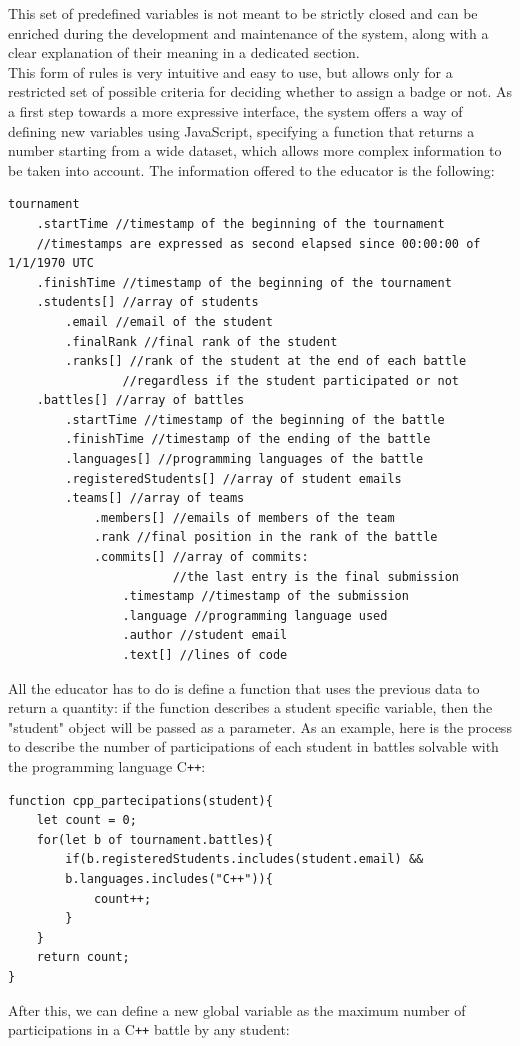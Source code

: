 This set of predefined variables is not meant to be strictly closed and can be enriched during the development and maintenance of the system, along with a clear explanation of their meaning in a dedicated section.
\\
This form of rules is very intuitive and easy to use, but allows only for a restricted set of possible criteria for deciding whether to assign a badge or not. As a first step towards a more expressive interface, the system offers a way of defining new variables using JavaScript, specifying a function that returns a number starting from a wide dataset, which allows more complex information to be taken into account. The information offered to the educator is the following:
\begin{verbatim}
tournament
    .startTime //timestamp of the beginning of the tournament
    //timestamps are expressed as second elapsed since 00:00:00 of 1/1/1970 UTC
    .finishTime //timestamp of the beginning of the tournament
    .students[] //array of students
        .email //email of the student
        .finalRank //final rank of the student
        .ranks[] //rank of the student at the end of each battle
                //regardless if the student participated or not
    .battles[] //array of battles
        .startTime //timestamp of the beginning of the battle
        .finishTime //timestamp of the ending of the battle
        .languages[] //programming languages of the battle
        .registeredStudents[] //array of student emails
        .teams[] //array of teams
            .members[] //emails of members of the team
            .rank //final position in the rank of the battle
            .commits[] //array of commits:
                       //the last entry is the final submission
                .timestamp //timestamp of the submission
                .language //programming language used
                .author //student email
                .text[] //lines of code
\end{verbatim}

All the educator has to do is define a function that uses the previous data to return a quantity: if the function describes a student specific variable, then the "student" object will be passed as a parameter. As an example, here is the process to describe the number of participations of each student in battles solvable with the programming language C\texttt{++}:

\begin{verbatim}
function cpp_partecipations(student){
    let count = 0;
    for(let b of tournament.battles){
        if(b.registeredStudents.includes(student.email) && 
        b.languages.includes("C++")){
            count++;
        }
    }
    return count;
}
\end{verbatim}
After this, we can define a new global variable as the maximum number of participations in a C\texttt{++} battle by any student:

